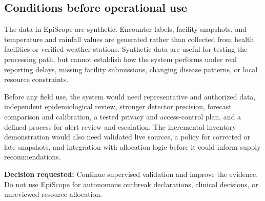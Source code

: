 \documentclass[11pt,a4paper]{article}
\begin{document}
\subsection*{Conditions before operational use}
The data in EpiScope are synthetic. Encounter labels, facility snapshots, and temperature and rainfall values are generated rather than collected from health facilities or verified weather stations. Synthetic data are useful for testing the processing path, but cannot establish how the system performs under real reporting delays, missing facility submissions, changing disease patterns, or local resource constraints.

Before any field use, the system would need representative and authorized data, independent epidemiological review, stronger detector precision, forecast comparison and calibration, a tested privacy and access-control plan, and a defined process for alert review and escalation. The incremental inventory demonstration would also need validated live sources, a policy for corrected or late snapshots, and integration with allocation logic before it could inform supply recommendations.

\vspace{1.5em}
\noindent\textbf{Decision requested:} Continue supervised validation and improve the evidence. Do not use EpiScope for autonomous outbreak declarations, clinical decisions, or unreviewed resource allocation.

\clearpage
\end{document}
